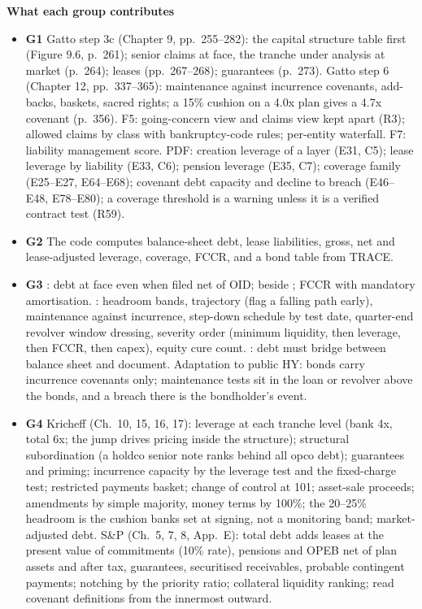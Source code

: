 \documentclass[11pt]{article}
\newcommand{\GA}{\textcolor{gA}{\textbf{G1}}}
\newcommand{\GB}{\textcolor{gB}{\textbf{G2}}}
\newcommand{\GC}{\textcolor{gC}{\textbf{G3}}}
\newcommand{\GD}{\textcolor{gD}{\textbf{G4}}}
\newcommand{\fld}[1]{\par\medskip\noindent\textbf{\textcolor{steel}{#1}}\par\nopagebreak}
\begin{document}
\fld{What each group contributes}
\begin{itemize}
\item \GA{} Gatto step 3c (Chapter 9, pp.~255--282): the capital structure table first (Figure 9.6, p.~261); senior claims at face, the tranche under analysis at market (p.~264); leases (pp.~267--268); guarantees (p.~273). Gatto step 6 (Chapter 12, pp.~337--365): maintenance against incurrence covenants, add-backs, baskets, sacred rights; a 15\% cushion on a 4.0x plan gives a 4.7x covenant (p.~356). F5: going-concern view and claims view kept apart (R3); allowed claims by class with bankruptcy-code rules; per-entity waterfall. F7: liability management score. PDF: creation leverage of a layer (E31, C5); lease leverage by liability (E33, C6); pension leverage (E35, C7); coverage family (E25--E27, E64--E68); covenant debt capacity and decline to breach (E46--E48, E78--E80); a coverage threshold is a warning unless it is a verified contract test (R59).
\item \GB{} The code computes balance-sheet debt, lease liabilities, gross, net and lease-adjusted leverage, coverage, FCCR, and a bond table from TRACE.
\item \GC{} : debt at face even when filed net of OID;  beside ; FCCR with mandatory amortisation. : headroom bands, trajectory (flag a falling path early), maintenance against incurrence, step-down schedule by test date, quarter-end revolver window dressing, severity order (minimum liquidity, then leverage, then FCCR, then capex), equity cure count. : debt must bridge between balance sheet and document. Adaptation to public HY: bonds carry incurrence covenants only; maintenance tests sit in the loan or revolver above the bonds, and a breach there is the bondholder's event.
\item \GD{} Kricheff (Ch.~10, 15, 16, 17): leverage at each tranche level (bank 4x, total 6x; the jump drives pricing inside the structure); structural subordination (a holdco senior note ranks behind all opco debt); guarantees and priming; incurrence capacity by the leverage test and the fixed-charge test; restricted payments basket; change of control at 101; asset-sale proceeds; amendments by simple majority, money terms by 100\%; the 20--25\% headroom is the cushion banks set at signing, not a monitoring band; market-adjusted debt. S\&P (Ch.~5, 7, 8, App.~E): total debt adds leases at the present value of commitments (10\% rate), pensions and OPEB net of plan assets and after tax, guarantees, securitised receivables, probable contingent payments; notching by the priority ratio; collateral liquidity ranking; read covenant definitions from the innermost outward.
\end{itemize}
\end{document}

